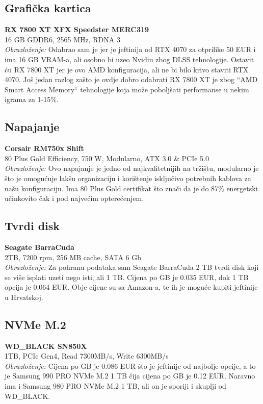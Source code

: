 \documentclass{article}
\begin{document}
\subsection*{Grafička kartica}
\textbf{RX 7800 XT XFX Speedster MERC319} \\
16 GB GDDR6, 2565 MHz, RDNA 3 \\
\textit{Obrazloženje:} Odabrao sam je jer je jeftinija od RTX 4070 za otprilike 50 EUR i ima 16 GB VRAM-a, ali osobno bi uzeo Nvidiu zbog DLSS tehnologije. Ostavit ću RX 7800 XT jer je ovo AMD konfiguracija, ali ne bi bilo krivo staviti RTX 4070. Još jedan razlog zašto je ovdje dobro odabrati RX 7800 XT je zbog “AMD Smart Access Memory“ tehnologije koja može poboljšati performanse u nekim igrama za 1-15\%.

\subsection*{Napajanje}
\textbf{Corsair RM750x Shift} \\
80 Plus Gold Efficiency, 750 W, Modularno, ATX 3.0 \& PCIe 5.0 \\
\textit{Obrazloženje:} Ovo napajanje je jedno od najkvalitetnijih na tržištu, modularno je što je omogućuje lakšu organizaciju i korištenje isključivo potrebnih kablova za našu konfiguraciju. Ima 80 Plus Gold certifikat što znači da je do 87\% energetski učinkovito čak i pod najvećim opterećenjem. 

\subsection*{Tvrdi disk}
\textbf{Seagate BarraCuda} \\
2TB, 7200 rpm, 256 MB cache, SATA 6 Gb \\
\textit{Obrazloženje:} Za pohranu podataka sam Seagate BarraCuda 2 TB tvrdi disk koji se više isplati uzeti nego isti, ali 1 TB. Cijena po GB je 0.035 EUR, dok 1 TB opcija je 0.064 EUR. Obje cijene su sa Amazon-a, te ih je moguće kupiti jeftinije u Hrvatskoj.

\subsection*{NVMe M.2}
\textbf{WD\_BLACK SN850X} \\
1TB, PCIe Gen4, Read 7300MB/s, Write 6300MB/s \\
\textit{Obrazloženje:} Cijena po GB je 0.086 EUR što je jeftinije od najbolje opcije, a to je Samsung 990 PRO NVMe M.2 1 TB čija cijena po GB je 0.12 EUR. Naravno ima i Samsung 980 PRO NVMe M.2 1 TB, ali on je sporiji i skuplji od WD\_BLACK.
\end{document}
